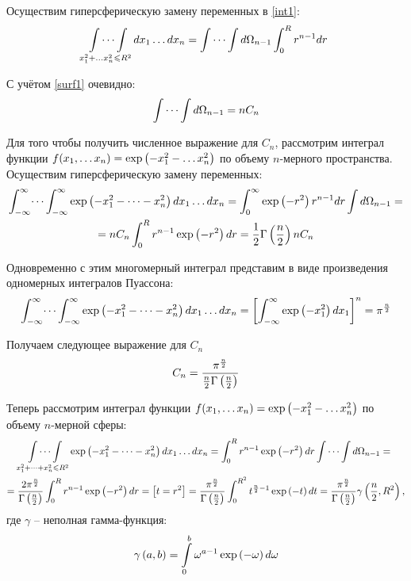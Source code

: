 Осуществим гиперсферическую замену переменных в \eqref{int1}:
\vverh
\begin{gather}
	\idotsint\limits_{x_1^2 + \dots x_n^2 \leqslant R^2} dx_1 \dots dx_n = \idotsint d \Omega_{n-1} \int_{0}^{R} r^{n-1} dr \notag
\end{gather}
\par
С учётом \eqref{surf1} очевидно:
\vverh
\begin{gather}
	\idotsint d \Omega_{n-1} = n C_n \notag
\end{gather}

Для того чтобы получить численное выражение для $C_n$, рассмотрим интеграл функции $f(x_1, \dots x_n) = \exp \left( -x_1^2 - \dots x_n^2 \right)$ по объему $n$-мерного пространства. Осуществим гиперсферическую замену переменных: 
\vverh
\begin{gather}
	\int_{-\infty}^{\infty} \dots \int_{-\infty}^{\infty} \exp \left( -x_1^2 - \dots -x_n^2 \right) dx_1 \dots dx_n = \int_{0}^{\infty} \exp \left( -r^2 \right) r^{n-1} dr \int d \Omega_{n-1}  = \notag \\
	= n C_n \int_{0}^{R} r^{n-1} \exp \left( -r^2 \right) dr = \frac{1}{2} \Gamma \left( \frac{n}{2} \right) n C_n \notag
\end{gather}

Одновременно с этим многомерный интеграл представим в виде произведения одномерных интегралов Пуассона:
\vverh
\begin{gather}
	\int_{-\infty}^{\infty} \dots \int_{-\infty}^{\infty} \exp \left( -x_1^2 - \dots - x_n^2 \right) d x_1 \dots dx_n = \left[ \int_{-\infty}^{\infty} \exp \left( -x_1^2 \right) dx_1 \right]^n  = \pi^\frac{n}{2} \notag 
\end{gather}

Получаем следующее выражение для $C_n$ 
\vverh
\begin{gather}
	C_n = \frac{\pi^\frac{n}{2}}{\frac{n}{2} \Gamma \left( \frac{n}{2} \right)} \notag
\end{gather}

Теперь рассмотрим интеграл функции $f(x_1, \dots x_n) = \exp \left( -x_1^2 - \dots x_n^2 \right)$ по объему $n$-мерной сферы:  
\begin{gather}
	\idotsint\limits_{x_1^2 + \dots + x_n^2 \leqslant R^2} \exp \left( -x_1^2 - \dots - x_n^2 \right) dx_1 \dots dx_n = \int_{0}^{R} r^{n-1} \exp \left( -r^2 \right) dr \idotsint d \Omega_{n-1} = \notag \\
	= \frac{2 \pi^{\frac{n}{2}}}{\Gamma \left( \frac{n}{2} \right)} \int_{0}^{R} r^{n-1} \exp \left( -r^2 \right) dr = \left[ t = r^2 \right] = \frac{\pi^{\frac{n}{2}}}{\Gamma \left( \frac{n}{2} \right)} \int_{0}^{R^2} t^{\frac{n}{2} - 1} \exp \left( -t \right) dt = \frac{\pi^{\frac{n}{2}}}{\Gamma \left( \frac{n}{2} \right)} \gamma \left( \frac{n}{2}, R^2 \right), \notag
\end{gather}
где $\gamma$ -- неполная гамма-функция:
\vverh
\begin{gather}
	\gamma \left( a, b \right) = \int\limits_{0}^{b} \omega^{a - 1} \exp \left( - \omega \right) d \omega \notag
\end{gather}



